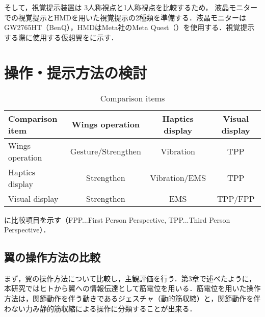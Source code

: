     そして，視覚提示装置は
    3人称視点と1人称視点を比較するため，
    液晶モニターでの視覚提示とHMDを用いた視覚提示の2種類を準備する．液晶モニターはGW2765HT（BenQ），HMDはMeta社のMeta Quest（）\cite{OculusQuest}を使用する．視覚提示する際に使用する仮想翼をに示す．

\section{操作・提示方法の検討}

    \begin{table}[tb]
        \begin{center}
            \caption{Comparison items}
            \begin{tabular}{l|c|c|c}
                \hline
                Comparison item & Wings operation & Haptics display & Visual display\\
                \hline
                Wings operation & Gesture/Strengthen & Vibration & TPP \\
                Haptics display & Strengthen & Vibration/EMS & TPP \\
                Visual display & Strengthen & EMS & TPP/FPP \\
                \hline
            \end{tabular}                
        \end{center}
    \end{table}

    に比較項目を示す（FPP...First Person Perspective, TPP...Third Person Perspective）．


    \subsection{翼の操作方法の比較}
        まず，翼の操作方法について比較し，主観評価を行う．第3章で述べたように，本研究ではヒトから翼への情報伝達として筋電位を用いる．筋電位を用いた操作方法は，関節動作を伴う動きであるジェスチャ（動的筋収縮）と，関節動作を伴わない力み静的筋収縮\cite{thistle1967isokinetic}による操作に分類することが出来る．

